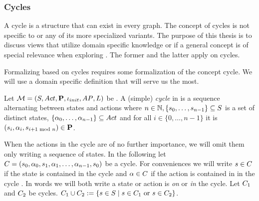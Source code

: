 \documentclass[preview]{standalone}
\begin{document}




\subsubsection{Cycles}
A cycle is a structure that can exist in every graph. The concept of cycles is not specific to \chgphsN or any of its more specialized variants. The purpose of this thesis is to discuss views that utilize domain specific knowledge or if a general concept is of special relevance when exploring \achgphN. The former and the latter apply on cycles.

Formalizing \viewsN based on cycles requires some formalization of the concept cycle. We will use a domain specific definition that will serve us the most.

\begin{definition}
	Let ${{{\mathcal{M}}}} = {{({S}, {Act}, {\textbf{P}}, {\iota_{init}}, {AP}, {L})}}$ be \achgphN. A (simple) \emph{cycle} \cycle in \chgph is a sequence \cyclesecfull alternating between states and actions where $n \in {\mathbb{N}}, \{{s}_0, \dots, {s}_{n-1}\} \subseteq {S}$ is a set of distinct states,  $\{{\alpha}_0, \dots, {\alpha}_{n-1}\} \subseteq {Act}$ and for all $i \in \{0, \dots, n-1\}$ it is $({s}_i,{\alpha}_i, {s}_{i+1 \text{ mod }n}) \in {\ensuremath{{\textbf{P}}}}$.
\end{definition}

When the actions in the cycle are of no further importance, we will omit them only writing a sequence of states. In the following let ${C} = {({s}_0, {\alpha}_0, {s}_1, {\alpha}_1, \dots, {\alpha}_{n-1}, {s}_0)}$ be a cycle. For conveniences we will write ${s} \in {C}$ if the state is contained in the cycle \cycle and ${\alpha} \in {C}$ if the action is contained in in the cycle \cycle.  In words we will both write a state or action is \emph{on} or \emph{in} the cycle. Let ${C}_1$ and ${C}_2$ be cycles. ${C}_1 \cup {C}_2 := \{{s} \in {S} \mid {s} \in {C}_1 \text{ or } {s} \in {C}_2\}$.
\end{document}

